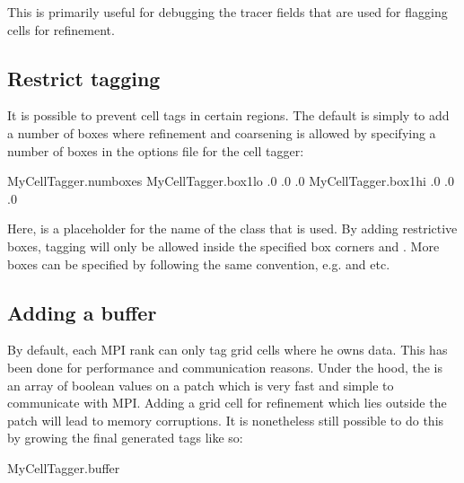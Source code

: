 \documentclass[letterpaper,10pt,english]{sphinxmanual}
\begin{document}
This is primarily useful for debugging the tracer fields that are used for flagging cells for refinement.


\subsection{Restrict tagging}
\label{\detokenize{Source/CellTagger:restrict-tagging}}
It is possible to prevent cell tags in certain regions.
The default is simply to add a number of boxes where refinement and coarsening is allowed by specifying a number of boxes in the options file for the cell tagger:

\begin{sphinxVerbatim}[commandchars=\\\{\},formatcom=\scriptsize]
MyCellTagger.num\PYGZus{}boxes                
MyCellTagger.box1\PYGZus{}lo      .0 .0 .0  
MyCellTagger.box1\PYGZus{}hi      .0 .0 .0  
\end{sphinxVerbatim}

Here,  is a placeholder for the name of the class that is used.
By adding restrictive boxes, tagging will only be allowed inside the specified box corners  and .
More boxes can be specified by following the same convention, e.g.  and  etc.


\subsection{Adding a buffer}
\label{\detokenize{Source/CellTagger:adding-a-buffer}}
By default, each MPI rank can only tag grid cells where he owns data.
This has been done for performance and communication reasons.
Under the hood, the  is an array of boolean values on a patch which is very fast and simple to communicate with MPI.
Adding a grid cell for refinement which lies outside the patch will lead to memory corruptions.
It is nonetheless still possible to do this by growing the final generated tags like so:

\begin{sphinxVerbatim}[commandchars=\\\{\},formatcom=\scriptsize]
MyCellTagger.buffer   
\end{sphinxVerbatim}
\end{document}
